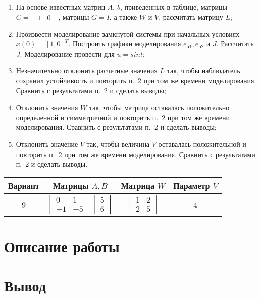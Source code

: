 \documentclass[14pt, a4paper]{extarticle}
\begin{document}
	\begin{enumerate}
		\item На основе известных матриц $A$, $b$, приведенных в таблице, матрицы $C = [
		\begin{matrix}
			1 & 0 
		\end{matrix}]$, матрицы $G=I$, а также $W$ и $V$, рассчитать матрицу $L$;
		\item Произвести моделирование замкнутой системы при начальных условиях $x(0)= [1,0]^T$. Построить графики моделирования $e_{\text{н}1}, e_{\text{н}2}$ и $J$. Рассчитать $J$. Моделирование провести для $u = sint$;
		\item Незначительно отклонить расчетные значения $L$ так, чтобы наблюдатель сохранил устойчивость и повторить п.~2 при том же времени моделирования. Сравнить с результатами п.~2 и сделать выводы;
		\item Отклонить значения $W$ так, чтобы матрица оставалась положительно определенной и симметричной и повторить п.~2 при том же времени моделирования. Сравнить с результатами п.~2 и сделать выводы;
		\item Отклонить значение $V$ так, чтобы величина $V$ оставалась положительной и повторить п.~2 при том же времени моделирования. Сравнить с результатами п.~2 и сделать выводы.
	\end{enumerate}
	\begin{table}[H]
		\centering
		\begin{tabular}{|c|c|c|c|}
			\hline
			Вариант & Матрицы $A,B$ & Матрица $W$ & Параметр $V$ \\\hline
			9 & 
			$\left[
			\begin{matrix}
				0 & 1 \\
				-1 & -5 
			\end{matrix}
			\right]
			\left[
			\begin{matrix}
				5 \\
				6
			\end{matrix}\right]$
			& 
			$\left[
			\begin{matrix}
				1 & 2 \\
				2 & 5
			\end{matrix}
			\right]$
			& 4 \\\hline
		\end{tabular}
	\end{table}
	
	\newpage
	
	\section*{Описание работы}
	
	
	\section*{Вывод}
	
\end{document}
